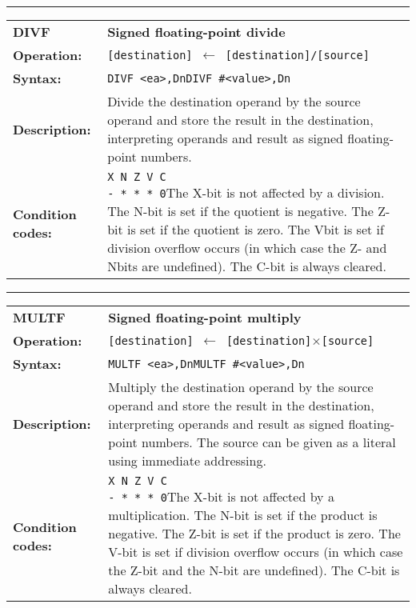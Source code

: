\documentclass[]{article}
\begin{document}
\begin{appendices}
\noindent\rule{10cm}{1pt}\newline %
\setlength\extrarowheight{5pt} %
\begin{tabularx}{\textwidth}{lL}
  {\Large \textbf{DIVF}} 	& {\Large \textbf{Signed floating-point divide}}\\
  \textbf{Operation:} 		& \texttt{[destination] $\leftarrow$ [destination]/[source]}\\
  \textbf{Syntax:}  		& \texttt{DIVF <ea>,Dn}\newline\texttt{DIVF \#<value>,Dn}\\
  \textbf{Description:}  	& Divide the destination operand by the source operand and store
the result in the destination, interpreting operands and result as signed floating-point numbers.\\
  \textbf{Condition codes:} & \texttt{X N Z V C\newline - * * * 0}\newline\newline The X-bit is not affected by a division. The N-bit is set if the
quotient is negative. The Z-bit is set if the quotient is zero. The Vbit
is set if division overflow occurs (in which case the Z- and Nbits
are undefined). The C-bit is always cleared.\\
\end{tabularx}
\newline

\noindent\rule{10cm}{1pt}\newline %
\setlength\extrarowheight{5pt} %
\begin{tabularx}{\textwidth}{lL}
  {\Large \textbf{MULTF}} 	& {\Large \textbf{Signed floating-point multiply}}\\
  \textbf{Operation:} 		& \texttt{[destination] $\leftarrow$ [destination]$\times$[source]}\\
  \textbf{Syntax:}  		& \texttt{MULTF <ea>,Dn}\newline\texttt{MULTF \#<value>,Dn}\\
  \textbf{Description:}  	& Multiply the destination operand by the source operand and store
the result in the destination, interpreting operands and result as signed floating-point numbers. The source can be given as a literal using immediate addressing.\\
  \textbf{Condition codes:} & \texttt{X N Z V C\newline - * * * 0}\newline\newline The X-bit is not affected by a multiplication. The N-bit is set if the 
product is negative. The Z-bit is set if the product is zero. The V-bit
is set if division overflow occurs (in which case the Z-bit and the N-bit
are undefined). The C-bit is always cleared.\\
\end{tabularx}
\newline


\end{appendices}
\end{document}
